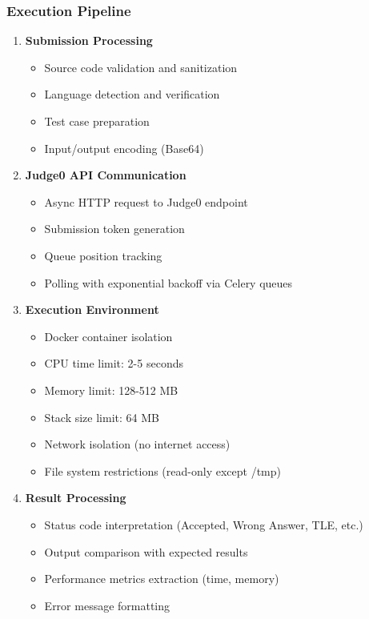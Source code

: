 \documentclass[conference]{IEEEtran}
\begin{document}
\subsubsection{Execution Pipeline}
\begin{enumerate}
    \item \textbf{Submission Processing}
    \begin{itemize}
        \item Source code validation and sanitization
        \item Language detection and verification
        \item Test case preparation
        \item Input/output encoding (Base64)
    \end{itemize}
    
    \item \textbf{Judge0 API Communication}
    \begin{itemize}
        \item Async HTTP request to Judge0 endpoint
        \item Submission token generation
        \item Queue position tracking
        \item Polling with exponential backoff via Celery queues
    \end{itemize}
    
    \item \textbf{Execution Environment}
    \begin{itemize}
        \item Docker container isolation
        \item CPU time limit: 2-5 seconds
        \item Memory limit: 128-512 MB
        \item Stack size limit: 64 MB
        \item Network isolation (no internet access)
        \item File system restrictions (read-only except /tmp)
    \end{itemize}
    
    \item \textbf{Result Processing}
    \begin{itemize}
        \item Status code interpretation (Accepted, Wrong Answer, TLE, etc.)
        \item Output comparison with expected results
        \item Performance metrics extraction (time, memory)
        \item Error message formatting
    \end{itemize}
    

\end{enumerate}
\end{document}
